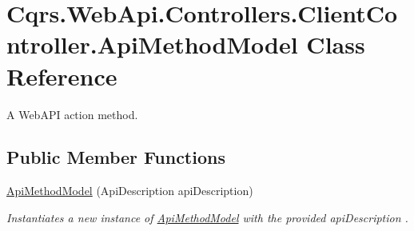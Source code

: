 \hypertarget{classCqrs_1_1WebApi_1_1Controllers_1_1ClientController_1_1ApiMethodModel}{}\section{Cqrs.\+Web\+Api.\+Controllers.\+Client\+Controller.\+Api\+Method\+Model Class Reference}
\label{classCqrs_1_1WebApi_1_1Controllers_1_1ClientController_1_1ApiMethodModel}


A Web\+A\+PI action method.  


\subsection*{Public Member Functions}
\begin{DoxyCompactItemize}
\item 
\hyperlink{classCqrs_1_1WebApi_1_1Controllers_1_1ClientController_1_1ApiMethodModel_a6d1bf1c1016565c5ca50c6591dc7f9c1_a6d1bf1c1016565c5ca50c6591dc7f9c1}{Api\+Method\+Model} (Api\+Description api\+Description)
\begin{DoxyCompactList}\small\item\em Instantiates a new instance of \hyperlink{classCqrs_1_1WebApi_1_1Controllers_1_1ClientController_1_1ApiMethodModel}{Api\+Method\+Model} with the provided {\itshape api\+Description} . \end{DoxyCompactList}\end{DoxyCompactItemize}
